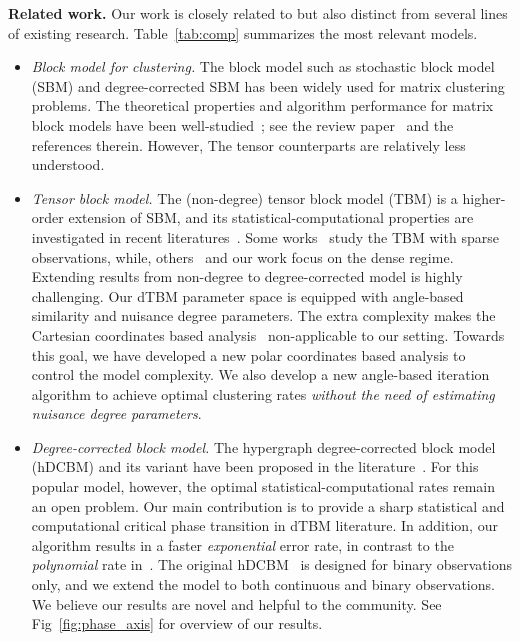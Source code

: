 \documentclass[journal]{IEEEtran}
\theoremstyle{definition}
\theoremstyle{definition}
\begin{document}
{\bf Related work.} 
Our work is closely related to but also distinct from several lines of existing research. Table~\ref{tab:comp} summarizes the most relevant models. 

\begin{itemize}[wide]
    \item \textit{Block model for clustering.} The block model such as stochastic block model (SBM) and degree-corrected SBM has been widely used for matrix clustering problems. The theoretical properties and algorithm performance for matrix block models have been well-studied~\citep{gao2018community}; see the review paper~\citep{abbe2017community} and the references therein. However, The tensor counterparts are relatively less understood. 
    
    \item  \textit{Tensor block model.} The (non-degree) tensor block model (TBM) is a higher-order extension of SBM, and its statistical-computational properties are investigated in recent literatures~\citep{wang2019multiway, han2020exact, ghoshdastidar2017consistency}. Some works~\citep{ahn2018hypergraph} study the TBM with sparse observations, while, others~\citep{wang2019multiway, han2020exact} and our work focus on the dense regime. Extending results from non-degree to degree-corrected model is highly challenging. Our dTBM parameter space is equipped with angle-based similarity and nuisance degree parameters. The extra complexity makes the Cartesian coordinates based analysis~\citep{han2020exact} non-applicable to our setting. Towards this goal, we have developed a new polar coordinates based analysis to control the model complexity. We also develop a new angle-based iteration algorithm to achieve optimal clustering rates \emph{without the need of estimating nuisance degree parameters}.
    
    
    \item \textit{Degree-corrected block model.} The hypergraph degree-corrected block model (hDCBM) and its variant have been proposed in the literature~\citep{ke2019community, yuan2022testing}. For this popular model, however, the optimal statistical-computational rates remain an open problem. Our main contribution is to provide a sharp statistical and computational critical phase transition in dTBM literature. In addition, our algorithm results in a faster \emph{exponential} error rate, in contrast to the \emph{polynomial} rate in~\cite{ke2019community}. The original hDCBM~\citep{ke2019community} is designed for binary observations only, and we extend the model to both continuous and binary observations. We believe our results are novel and helpful to the community. See Fig~\ref{fig:phase_axis} for overview of our results. 
    

\end{itemize}
\end{document}
